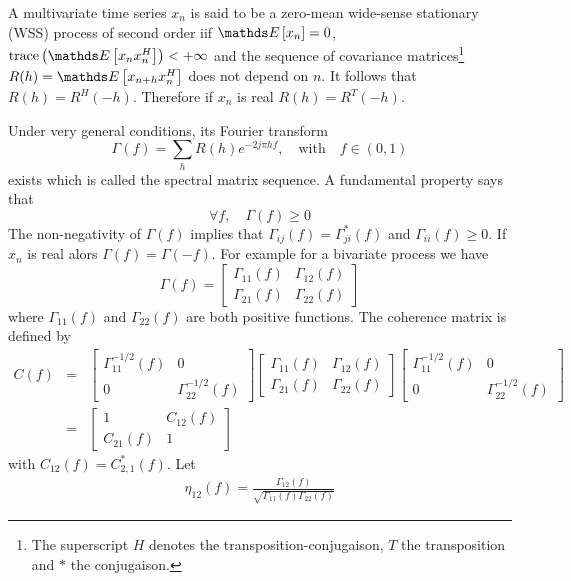 A multivariate time series $x_{n}$ is said to be a zero-mean wide-sense stationary (WSS) process of second order iif $\esp{x_{n}}=0$, $\trace{\esp{x_{n}x_{n}^{H}}}<+\infty$ and the sequence of covariance matrices\footnote{The superscript $H$ denotes the transposition-conjugaison, $T$ the transposition and $*$ the conjugaison.} $R(h)=\esp{x_{n+h}x_{n}^{H}}$ does not depend on $n$. 
It follows that $R(h)=R^{H}(-h)$. Therefore if $x_{n}$ is real $R(h)=R^{T}(-h)$.

Under very general conditions, its Fourier transform
$$
 \Gamma(f)=\sum_{h} R(h)e^{-2j\pi hf},\quad\text{with}\quad 
 f\in(0,1)
$$
exists which is called the spectral matrix sequence. A fundamental property says that 
$$
 \forall f, \quad \Gamma(f)\geq 0
$$
The non-negativity of $\Gamma(f)$ implies that $\Gamma_{ij}(f)=\Gamma_{ji}^{*}(f)$ and $\Gamma_{ii}(f)\geq 0$. If $x_{n}$ is real alors $\Gamma(f)=\Gamma(-f)$. For example for a bivariate process we have
$$
 \Gamma(f)=
 \begin{bmatrix}
 \Gamma_{11}(f)&\Gamma_{12}(f)\\
 \Gamma_{21}(f)&\Gamma_{22}(f)
 \end{bmatrix}
$$
where $ \Gamma_{11}(f)$ and $ \Gamma_{22}(f)$ are both positive functions. The coherence matrix is defined by
\begin{eqnarray*}
 C(f) 
 &=&
 \begin{bmatrix}
 \Gamma_{11}^{-1/2}(f)&0
 \\
 0& \Gamma_{22}^{-1/2}(f)
 \end{bmatrix}
  \begin{bmatrix}
 \Gamma_{11}(f)&\Gamma_{12}(f)\\ \Gamma_{21}(f)&\Gamma_{22}(f)
 \end{bmatrix}
 \begin{bmatrix}
 \Gamma_{11}^{-1/2}(f)&0
 \\
 0& \Gamma_{22}^{-1/2}(f)
 \end{bmatrix}
 \\
 &=&
   \begin{bmatrix}
 1&C_{12}(f)\\ C_{21}(f)&1
 \end{bmatrix}
\end{eqnarray*}
with $C_{12}(f)=C_{2,1}^{*}(f)$. Let
\begin{eqnarray}
\label{eq:defCSD}
 \eta_{12}(f)= \frac{\Gamma_{12}(f)}{\sqrt{\Gamma_{11}(f)\Gamma_{22}(f)}}
\end{eqnarray}
